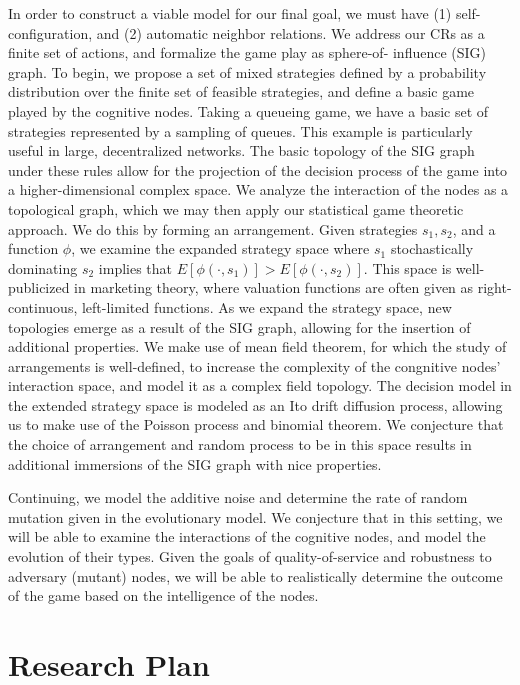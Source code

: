 \documentclass[10pt]{article}
\theoremstyle{definition}
\begin{document}
In order to construct a
viable model for our final goal, we must have (1) self-configuration, and (2) automatic neighbor
relations. We address our CRs as a finite set of actions, and formalize the game play as sphere-of-
influence (SIG) graph. To begin, we propose a set of mixed strategies defined by a probability
distribution over the finite set of feasible strategies, and define a basic game played by the
cognitive nodes.
Taking a queueing game, we have a basic set of strategies represented by a
sampling of queues. This example is particularly useful in large, decentralized
networks. The basic topology of the SIG graph under these rules allow for the
projection of the decision process of the game into a higher-dimensional complex
space. We analyze the interaction of the nodes as a topological graph, which we
may then apply our statistical game theoretic approach. We do this by forming an
arrangement. Given strategies $s_1, s_2$, and a function $\phi$, we examine the
expanded strategy space where $s_1$ stochastically dominating $s_2$ implies that
$E[\phi (\cdot, s_1 )] > E[\phi (\cdot, s_2 )]$. This space is well-publicized
in marketing theory, where valuation functions are often given as
right-continuous, left-limited functions. As we expand the strategy space, new
topologies emerge as a result of the SIG graph, allowing for the insertion of
additional properties. We make use of mean field theorem, for which the study of
arrangements is well-defined, to increase the complexity of the congnitive
nodes' interaction space, and model it as a complex field topology. The decision model in the extended strategy space is modeled as an Ito drift diffusion process, allowing us to make use of the Poisson process and binomial theorem. We conjecture that the choice of arrangement and random process to be in this space results in additional immersions of the SIG graph with nice properties.

Continuing, we model the additive noise and determine the rate of random mutation
given in the evolutionary model.
We conjecture that in this setting, we will be able to examine the interactions of the cognitive nodes, and model the evolution of their types. Given the goals of quality-of-service and robustness to adversary (mutant) nodes, we will be able to realistically determine the outcome of the game based on the intelligence of the nodes.

\section{Research Plan}
\end{document}
